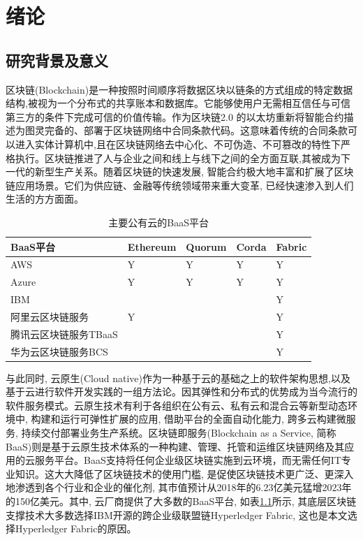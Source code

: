 \chapter{绪论}

\section{研究背景及意义}

区块链(Blockchain)是一种按照时间顺序将数据区块以链条的方式组成的特定数据结构,被视为一个分布式的共享账本和数据库。它能够使用户无需相互信任与可信第三方的条件下完成可信的价值传输\cite{SurveyofEnterpriseBlockchains}。作为区块链2.0 的以太坊\footnotemark[1]重新将智能合约描述为图灵完备的、部署于区块链网络中合同条款代码。这意味着传统的合同条款可以进入实体计算机中,且在区块链网络去中心化、不可伪造、不可篡改的特性下严格执行。区块链推进了人与企业之间和线上与线下之间的全方面互联,其被成为下一代的新型生产关系。随着区块链的快速发展, 智能合约极大地丰富和扩展了区块链应用场景。它们为供应链、金融等传统领域带来重大变革, 已经快速渗入到人们生活的方方面面。

{\footnotesize
\begin{longtable}[h]{m{100pt}|m{50pt}|m{50pt}|m{50pt}|m{50pt}}
    \caption[主要公有云的BaaS平台]{主要公有云的BaaS平台} \label{major_BaaS_platforms} \\
        \hline  
        BaaS平台&Ethereum&Quorum&Corda&Fabric\\
        \hline
        AWS&Y&Y&Y&Y\\
        \hline
        Azure&Y&Y&Y&Y\\
        \hline
        IBM& & & &Y\\
        \hline
        阿里云区块链服务&Y& & &Y\\
        \hline
        腾讯云区块链服务TBaaS& & & &Y\\
        \hline
        华为云区块链服务BCS& & & &Y\\
        \hline
    \end{longtable}
}

与此同时, 云原生(Cloud native)作为一种基于云的基础之上的软件架构思想,以及基于云进行软件开发实践的一组方法论。因其弹性和分布式的优势成为当今流行的软件服务模式。云原生技术有利于各组织在公有云、私有云和混合云等新型动态环境中, 构建和运行可弹性扩展的应用, 借助平台的全面自动化能力, 跨多云构建微服务, 持续交付部署业务生产系统。区块链即服务(Blockchain as a Service, 简称BaaS)则是基于云原生技术体系的一种构建、管理、托管和运维区块链网络及其应用的云服务平台\cite{onik2019performance}。BaaS支持将任何企业级区块链实施到云环境，而无需任何IT专业知识。这大大降低了区块链技术的使用门槛, 是促使区块链技术更广泛、更深入地渗透到各个行业和企业的催化剂, 其市值预计从2018年的6.23亿美元猛增2023年的150亿美元\footnotemark[1]。其中, 云厂商提供了大多数的BaaS平台\cite{KuernetesbasedFabricChaincodeManagementAndHihgAvailabilityTechnology}, 如表\ref{major_BaaS_platforms}所示, 其底层区块链支撑技术大多数选择IBM开源的跨企业级联盟链Hyperledger Fabric, 这也是本文选择Hyperledger Fabric的原因。

